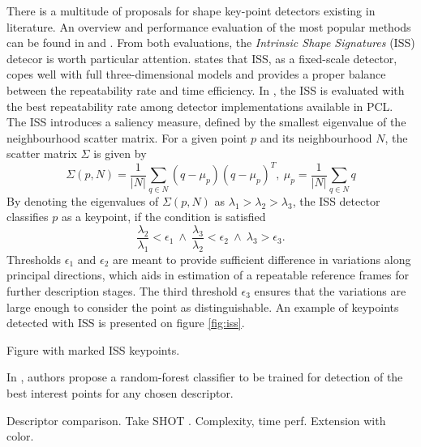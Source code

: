 There is a multitude of proposals for shape key-point detectors existing in literature. An overview and performance evaluation of the most popular methods can be found in \cite{keypoints1} and \cite{keypoints2}. From both evaluations, the \textit{Intrinsic Shape Signatures} (ISS) \cite{ISS} detecor is worth particular attention. \cite{keypoints1} states that ISS, as a fixed-scale detector, copes well with full three-dimensional models and provides a proper balance between the repeatability rate and time efficiency. In \cite{keypoints2}, the ISS is evaluated with the best repeatability rate among detector implementations available in PCL. The ISS introduces a saliency measure, defined by the smallest eigenvalue of the neighbourhood scatter matrix. For a given point $p$ and its neighbourhood $N$, the scatter matrix $\Sigma$ is given by
\begin{equation}
\label{eq:scatter}
\Sigma(p,N) = \frac{1}{|N|} \sum\limits_{q\in N}(q -\mu_p)(q - \mu_p)^T,\ \mu_p = \frac{1}{|N|}\sum\limits_{q\in N}q
\end{equation}
By denoting the eigenvalues of $\Sigma(p, N)$ as $\lambda_1 > \lambda_2 > \lambda_3$, the ISS detector classifies $p$ as a keypoint, if the condition is satisfied
\begin{equation}
\label{iss}
\frac{\lambda_2}{\lambda_1} < \epsilon_1 \  \land \  \frac{\lambda_3}{\lambda_2} < \epsilon_2 \ \land \  \lambda_3 > \epsilon_3.
\end{equation} 
Thresholds $\epsilon_1$ and $\epsilon_2$ are meant to provide sufficient difference in variations along principal directions, which aids in estimation of a repeatable reference frames for further description stages. The third threshold $\epsilon_3$ ensures that the variations are large enough to consider the point as distinguishable. An example of keypoints detected with ISS is presented on figure \ref{fig:iss}.

Figure with marked ISS keypoints.

In \cite{keypoints-learning}, authors propose a random-forest classifier to be trained for detection of the best interest points for any chosen descriptor.


Descriptor comparison. Take SHOT \cite{SHOT}. Complexity, time perf. Extension with color. \cite{CSHOT}

